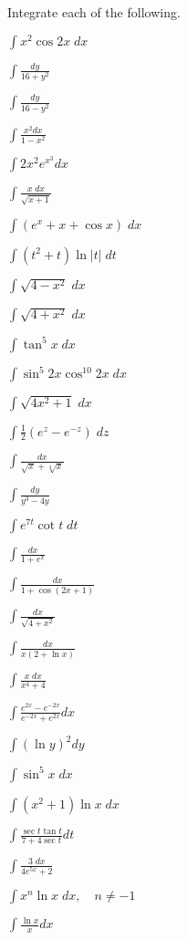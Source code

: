 \begin{exercises}

\item[]
Integrate each of the following.

$\int x^2\cos 2x \; dx$

$\int \frac{dy}{16+y^2}$

$\int \frac{dy}{16-y^2}$

$\int \frac{x^2dx}{1-x^2}$

$\int 2x^2e^{x^3}dx$

$\int \frac{x\;dx}{\sqrt{x+1}}$

$\int (e^x+x+\cos x)\;dx$

$\int (t^2+t) \ln|t| \; dt$

$\int \sqrt{4-x^2} \; dx$

$\int \sqrt{4+x^2} \; dx$

$\int \tan^5 x \; dx$

$\int \sin^5 2x \cos^{10} 2x \; dx$

$\int \sqrt{4x^2+1}\;dx$

$\int \frac12(e^z - e^{-z}) \; dz$

$\int \frac{dx}{\sqrt{x} + \sqrt[4]{x}}$

$\int \frac{dy}{y^3-4y}$

$\int e^{7t} \cot t\;dt$

$\int \frac{dx}{1+e^x}$

$\int \frac{dx}{1+\cos(2x+1)}$

$\int \frac{dx}{\sqrt{4+x^2}}$

$\int \frac{dx}{x(2+\ln x)}$

$\int \frac{x\;dx}{x^4+4}$

$\int \frac{e^{2x} - e^{-2x}}{e^{-2x} + e^{2x}}dx$

$\int (\ln y)^2 dy$

$\int \sin^5x \; dx$

$\int (x^2+1) \ln x \; dx$

$\int \frac{\sec t \tan t}{7+4\sec t}dt$

$\int \frac{3\;dx}{4e^{5x} + 2}$

$\int x^n \ln x \; dx, \quad n\ne -1$

$\int \frac{\ln x}x dx$


\end{exercises}
